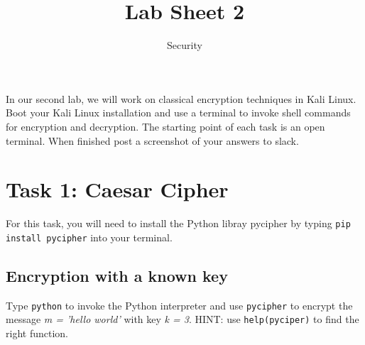 \documentclass{article}
\title{Lab Sheet 2}
\date{Security}
\begin{document}
\maketitle
In our second lab, we will work on classical encryption techniques in Kali Linux. Boot your Kali Linux installation and use a terminal to invoke shell commands for encryption and decryption. The starting point of each task is an open terminal. When finished post a screenshot of your answers to slack.
\section{Task 1: Caesar Cipher}
For this task, you will need to install the Python libray pycipher by typing \texttt{pip install pycipher} into your terminal.
\subsection{Encryption with a known key}
Type \texttt{python} to invoke the Python interpreter and use \texttt{pycipher} to encrypt the message \textit{m = 'hello world'} with key \textit{k = 3}.
HINT: use \texttt{help(pyciper)} to find the right function.
\end{document}
